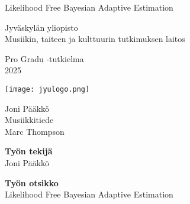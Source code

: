 \documentclass[]{scrartcl}
\begin{document}
\begin{center}
	\vspace*{\fill}
	\Huge{Likelihood Free Bayesian Adaptive Estimation}
	
	\vspace{2cm}
	
	\LARGE{Jyväskylän yliopisto}\\

	\LARGE{Musiikin, taiteen ja kulttuurin tutkimuksen laitos}\\
	
	\vspace{0.25cm}
	
	\LARGE{Pro Gradu -tutkielma}\\

	\LARGE{2025}

	
	
	\vspace*{\fill}
\end{center}

\begin{minipage}{0.7\linewidth}
	\hspace{2.3in}
	\texttt{[image: jyulogo.png]}
\end{minipage}
\begin{minipage}{0.3\linewidth}
	\begin{flushright}
		Joni Pääkkö\\
		Musiikkitiede \\
		Marc Thompson
	\end{flushright}
\end{minipage}
	
\newpage

\begin{tcbitemize}[
	raster equal height,raster force size=false,
	raster equal skip=0pt,raster column skip=0mm,raster columns=1]
	\tcbitem[width=1.0\linewidth]
	\textbf{Työn tekijä}\\
	Joni Pääkkö
\end{tcbitemize}

\begin{tcbitemize}[
	raster equal height,raster force size=false,
	raster equal skip=0pt,raster column skip=0mm,raster columns=1]
	\tcbitem[width=1.0\linewidth]
	\textbf{Työn otsikko}\\
	Likelihood Free Bayesian Adaptive Estimation
\end{tcbitemize}
\end{document}
